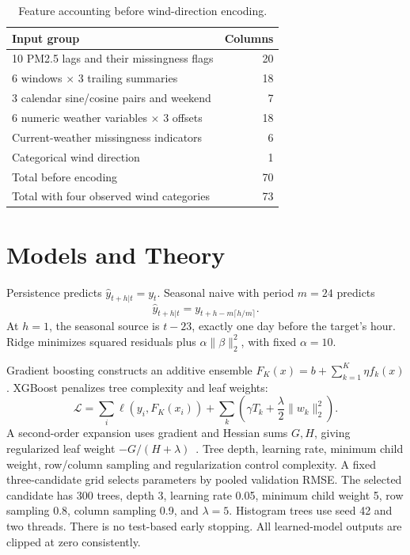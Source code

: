 \documentclass[conference]{IEEEtran}
\begin{document}
\begin{table}[ht]
\centering
\caption{Feature accounting before wind-direction encoding.}
\label{tab:features}
\begin{tabular}{lr}
\toprule
Input group & Columns\\\midrule
10 PM2.5 lags and their missingness flags & 20\\
6 windows $\times$ 3 trailing summaries & 18\\
3 calendar sine/cosine pairs and weekend & 7\\
6 numeric weather variables $\times$ 3 offsets & 18\\
Current-weather missingness indicators & 6\\
Categorical wind direction & 1\\\midrule
Total before encoding & 70\\
Total with four observed wind categories & 73\\\bottomrule
\end{tabular}
\end{table}

\section{Models and Theory}
Persistence predicts $\hat y_{t+h|t}=y_t$. Seasonal naive with period $m=24$ predicts
\begin{equation}
\hat y_{t+h|t}=y_{t+h-m\lceil h/m\rceil}.
\end{equation}
At $h=1$, the seasonal source is $t-23$, exactly one day before the target's hour. Ridge minimizes squared residuals plus $\alpha\lVert\beta\rVert_2^2$, with fixed $\alpha=10$.

Gradient boosting constructs an additive ensemble $F_K(x)=b+\sum_{k=1}^{K}\eta f_k(x)$. XGBoost penalizes tree complexity and leaf weights:
\begin{equation}
\mathcal L=\sum_i \ell(y_i,F_K(x_i))+\sum_k\left(\gamma T_k+\frac{\lambda}{2}\lVert w_k\rVert_2^2\right).
\end{equation}
A second-order expansion uses gradient and Hessian sums $G,H$, giving regularized leaf weight $-G/(H+\lambda)$~\cite{chen2016}. Tree depth, learning rate, minimum child weight, row/column sampling and regularization control complexity. A fixed three-candidate grid selects parameters by pooled validation RMSE. The selected candidate has 300 trees, depth 3, learning rate 0.05, minimum child weight 5, row sampling 0.8, column sampling 0.9, and $\lambda=5$. Histogram trees use seed 42 and two threads. There is no test-based early stopping. All learned-model outputs are clipped at zero consistently.
\end{document}
